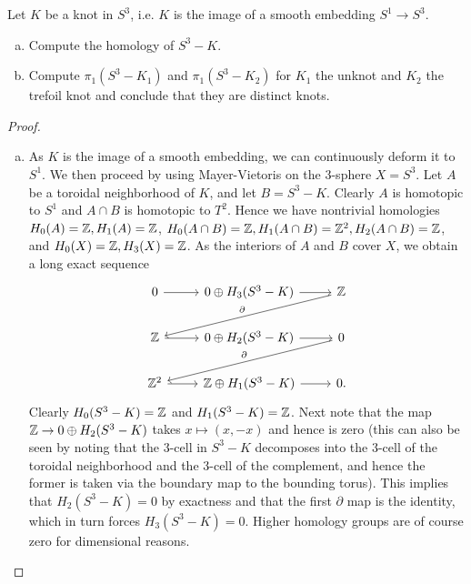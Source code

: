 \documentclass{../mathnotes}
\begin{document}
\newpage

\begin{prop}
    Let $K$ be a knot in $S^3$, i.e. $K$ is the image of a smooth embedding $S^1\to S^3$.
    \begin{enumerate}[(a)]
        \item Compute the homology of $S^3-K$.
        \item Compute $\pi_1(S^3-K_1)$ and $\pi_1(S^3-K_2)$ for $K_1$ the unknot and $K_2$
            the trefoil knot and conclude that they are distinct knots.
    \end{enumerate}
\end{prop}
\begin{proof}\hfill
    \begin{enumerate}[(a)]
        \item As $K$ is the image of a smooth embedding, we can continuously deform it to $S^1$. We then proceed by
            using Mayer-Vietoris on the 3-sphere $X=S^3$. Let $A$ be a toroidal neighborhood of $K$, and let $B=S^3-K$.
            Clearly $A$ is homotopic to $S^1$ and $A\cap B$ is homotopic to $T^2$. Hence we have nontrivial homologies
            $H_0(A)=\mathbb{Z},H_1(A)=\mathbb{Z}$, $H_0(A\cap B)=\mathbb{Z},H_1(A\cap B)=\mathbb{Z}^2,H_2(A\cap B)=\mathbb{Z}$, and $H_0(X)=\mathbb{Z},H_3(X)=\mathbb{Z}$. As the interiors of $A$ and $B$ cover $X$, we obtain
            a long exact sequence
            \begin{equation*}
                \begin{tikzcd}
                    0\ar{r} & 0 \oplus H_3(S^3-K)\ar{r} & \Z\ar[swap]{dll}{\partial}\\
                    \Z\ar{r} & 0\oplus H_2(S^3-K)\ar{r} & 0\ar[swap]{dll}{\partial}\\
                    \Z^2\ar{r} & \Z\oplus H_1(S^3-K)\ar{r} & 0.
                \end{tikzcd}
            \end{equation*}
            Clearly $H_0(S^3-K)=\mathbb{Z}$ and $H_1(S^3-K)=\mathbb{Z}$. Next note that the map $\mathbb{Z}\to0\oplus H_2(S^3-K)$
            takes $x\mapsto (x,-x)$ and hence is zero (this can also be seen by noting that the 3-cell in $S^3-K$
            decomposes into the 3-cell of the toroidal neighborhood and the 3-cell of the complement, and hence
            the former is taken via the boundary map to the bounding torus). This implies that $H_2(S^3-K)=0$ by exactness
            and that the first $\partial$ map is the identity, which in turn forces $H_3(S^3-K)=0$.
            Higher homology groups are of course zero for dimensional reasons.

\end{enumerate}
\end{proof}
\end{document}
